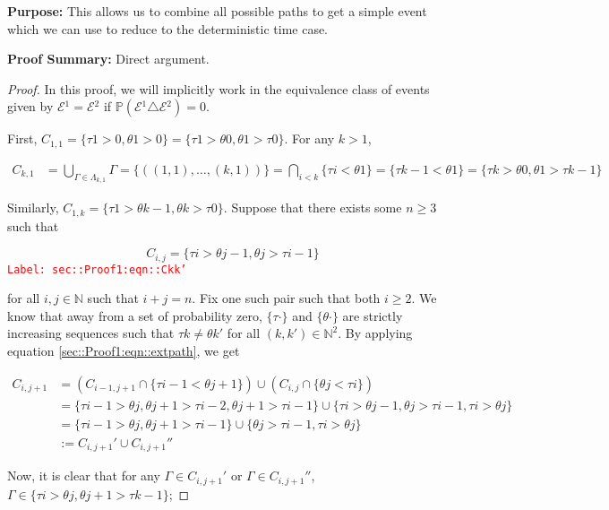 \documentclass[12pt]{article}
\newcommand{\mb}{\mathbb}
\newcommand{\mc}{\mathcal}
\newcommand{\tr}{\textcolor{red}}
\newcommand{\labe}[1]{\tr{\texttt{Label: #1}}}
\newcommand{\purpose}{\textbf{Purpose: }}
\newcommand{\pfsum}{\textbf{Proof Summary: }}
\newcommand{\ind}{\hspace{24pt}}
\newcommand{\pr}{\mb{P}}							%
\newcommand{\rt}{\tau}							%
\newcommand{\rtt}{\theta}						%
\renewcommand{\it}{k}							%
\newcommand{\apath}{\Gamma}						%
\newcommand{\pathset}[2]{\Lambda_{#1,#2}}		%
\newcommand{\pathsete}[2]{C_{#1,#2}}			%
\newcommand{\evnt}{\mc{E}}						%
\begin{document}
\purpose This allows us to combine all possible paths to get a simple event which we can use to reduce to the deterministic time case.

\pfsum Direct argument.

\begin{proof}
In this proof, we will implicitly work in the equivalence class of events given by \(\evnt{}^1 = \evnt{}^2\) if \(\pr(\evnt{}^1 \triangle \evnt{}^2) = 0\).  

\ind First, \(\pathsete{1}{1} = \{\rt{1} > 0,\rtt{1} > 0\} = \{\rt{1} > \rtt{0},\rtt{1}>\rt{0}\}\). For any \(\it > 1\),

\begin{align*}
\pathsete{\it}{1} &= \bigcup_{\apath{} \in \pathset{\it}{1}} \apath{} = \{((1,1),\dots,(\it,1))\} = \bigcap_{i < \it} \{\rt{i} < \rtt{1}\} = \{\rt{\it-1} < \rtt{1}\} = \{\rt{\it} > \rtt{0},\rtt{1} > \rt{\it-1}\}
\end{align*}

Similarly, \(\pathsete{1}{\it} = \{\rt{1} > \rtt{\it-1}, \rtt{\it} > \rt{0}\}\). Suppose that there exists some \(n\geq 3\) such that

\begin{equation}
\pathsete{i}{j} = \{\rt{i} > \rtt{j-1},\rtt{j} > \rt{i-1}\}
\label{sec::Proof1:eqn::Ckk'}
\end{equation}
\labe{sec::Proof1:eqn::Ckk'}

for all \(i, j\in \mb{N}\) such that \(i+j = n\). Fix one such pair such that both \(i \geq 2\). We know that away from a set of probability zero, \(\{\rt{\cdot}\}\) and \(\{\rtt{\cdot}\}\) are strictly increasing sequences such that \(\rt{\it} \neq \rtt{\it'}\) for all \((\it,\it')\in \mb{N}^2\). By applying equation \eqref{sec::Proof1:eqn::extpath}, we get

\begin{align*}
\pathsete{i}{j+1} &= \left(\pathsete{i-1}{j+1} \cap \{\rt{i - 1} < \rtt{j+1}\}\right) \cup \left(\pathsete{i}{j}\cap \{\rtt{j} < \rt{i}\}\right)\\
&= \{\rt{i - 1} > \rtt{j}, \rtt{j+1} > \rt{i - 2},  \rtt{j+1} > \rt{i -1}\}\cup\{\rt{i} > \rtt{j-1}, \rtt{j} > \rt{i - 1},\rt{i} > \rtt{j}\}\\
&= \{\rt{i - 1} > \rtt{j}, \rtt{j+1} > \rt{i - 1}\}\cup\{\rtt{j} > \rt{i - 1},\rt{i} > \rtt{j}\}\\
&:= \pathsete{i}{j+1}' \cup\pathsete{i}{j+1}''
\end{align*}

Now, it is clear that for any \(\apath{} \in \pathsete{i}{j+1}'\) or \(\apath{} \in \pathsete{i}{j+1}''\), \(\apath{}\in \{\rt{i} > \rtt{j},\rtt{j+1} > \rt{\it-1}\}\);


\end{proof}
\end{document}
